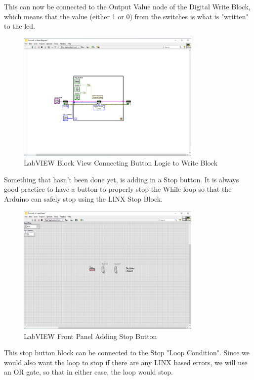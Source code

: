 \documentclass[a4paper,11pt]{report}
\begin{document}
This can now be connected to the Output Value node of the Digital Write Block, which means that the value (either 1 or 0) from the switches is what is "written" to the \gls{led}.

\begin{figure}[H]
\centering
\includegraphics[width=0.8\textwidth]{screenshots/labview26}
\caption{LabVIEW Block View Connecting Button Logic to Write Block}
\end{figure}

Something that hasn't been done yet, is adding in a Stop button. It is always good practice to have a button to properly stop the While loop so that the Arduino can safely stop using the LINX Stop Block.

\begin{figure}[H]
\centering
\includegraphics[width=0.8\textwidth]{screenshots/labview27}
\caption{LabVIEW Front Panel Adding Stop Button}
\end{figure}

This stop button block can be connected to the Stop "Loop Condition". Since we would also want the loop to stop if there are any LINX based errors, we will use an OR gate, so that in either case, the loop would stop.
\end{document}
